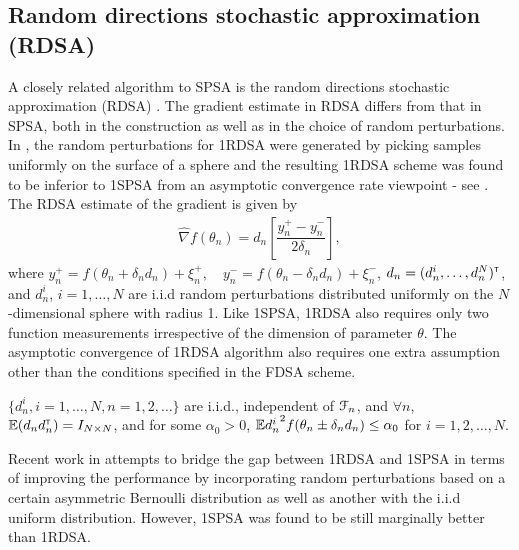 \subsection{Random directions stochastic approximation (RDSA)}
A closely related algorithm to SPSA is the random directions stochastic approximation (RDSA) \cite[pp.~58-60]{kushcla}. The gradient estimate in RDSA differs from that in SPSA, both in the construction as well as in the choice of random perturbations.  In \cite{kushcla}, the random perturbations for 1RDSA were generated by picking samples uniformly on the surface of a sphere and the resulting 1RDSA scheme was found to be  inferior to 1SPSA from an asymptotic convergence rate viewpoint - see \cite{chin1997comparative}.  
The RDSA estimate of the gradient is given by
\begin{align}
\label{eq:grad-unif}
\widehat\nabla f(\theta_n) = d_n \left[ \dfrac{y_n^+ - y_n^-}{2\delta_n}\right],
\end{align}
where $y_{n}^+ = f(\theta_n+\delta_n d_n) + \xi_{n}^+,\quad y_{n}^- = f(\theta_n-\delta_n d_n) + \xi_{n}^-$, $d_n = (d_n^i,\ldots,d_n^N)^\mathsf{\scriptscriptstyle T}$, and $d_n^i$, $ i=1,\ldots,N$ are i.i.d random perturbations distributed uniformly on the $N$-dimensional sphere with radius 1. Like 1SPSA, 1RDSA also requires only two function measurements irrespective of the dimension of parameter $\theta$. 
The asymptotic convergence of 1RDSA algorithm also requires one extra assumption other than the conditions specified in the FDSA scheme. 
\begin{pvn}
\item $\{ d_{n}^i, i=1,\ldots,N, n=1,2,\ldots\}$ are i.i.d., independent of $\mathcal{F}_n$, and $\forall n$, $\mathbb{E} (d_{n} d_{n}^\mathsf{\scriptscriptstyle T}) = I_{N \times N}$, and for some $\alpha_0 > 0$, $\mathbb{E} {d_{n}^i}^2 f(\theta_n \pm \delta_n d_n) \le \alpha_0$ for $i=1,2,\ldots,N$.
\end{pvn}
Recent work in \cite{prashanth2015rdsa} attempts to bridge the gap between 1RDSA and 1SPSA in terms of improving the performance by incorporating random perturbations based on a certain asymmetric Bernoulli
distribution as well as another with the  i.i.d uniform distribution. However,  1SPSA was found to be still marginally better than 1RDSA.  
